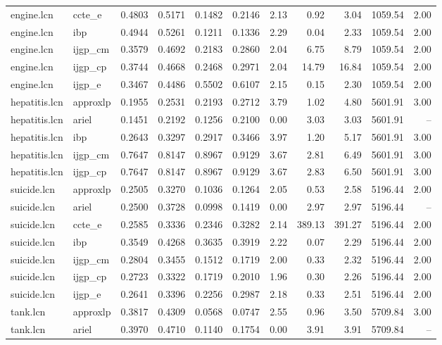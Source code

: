 \begin{table}[ht]
\begin{tabular}{llrrrrrrrrr}
engine.lcn & ccte_e & 0.4803 & 0.5171 & 0.1482 & 0.2146 & 2.13 & 0.92 & 3.04 & 1059.54 & 2.00 \\
engine.lcn & ibp & 0.4944 & 0.5261 & 0.1211 & 0.1336 & 2.29 & 0.04 & 2.33 & 1059.54 & 2.00 \\
engine.lcn & ijgp_cm & 0.3579 & 0.4692 & 0.2183 & 0.2860 & 2.04 & 6.75 & 8.79 & 1059.54 & 2.00 \\
engine.lcn & ijgp_cp & 0.3744 & 0.4668 & 0.2468 & 0.2971 & 2.04 & 14.79 & 16.84 & 1059.54 & 2.00 \\
engine.lcn & ijgp_e & 0.3467 & 0.4486 & 0.5502 & 0.6107 & 2.15 & 0.15 & 2.30 & 1059.54 & 2.00 \\
hepatitis.lcn & approxlp & 0.1955 & 0.2531 & 0.2193 & 0.2712 & 3.79 & 1.02 & 4.80 & 5601.91 & 3.00 \\
hepatitis.lcn & ariel & 0.1451 & 0.2192 & 0.1256 & 0.2100 & 0.00 & 3.03 & 3.03 & 5601.91 & -- \\
hepatitis.lcn & ibp & 0.2643 & 0.3297 & 0.2917 & 0.3466 & 3.97 & 1.20 & 5.17 & 5601.91 & 3.00 \\
hepatitis.lcn & ijgp_cm & 0.7647 & 0.8147 & 0.8967 & 0.9129 & 3.67 & 2.81 & 6.49 & 5601.91 & 3.00 \\
hepatitis.lcn & ijgp_cp & 0.7647 & 0.8147 & 0.8967 & 0.9129 & 3.67 & 2.83 & 6.50 & 5601.91 & 3.00 \\
suicide.lcn & approxlp & 0.2505 & 0.3270 & 0.1036 & 0.1264 & 2.05 & 0.53 & 2.58 & 5196.44 & 2.00 \\
suicide.lcn & ariel & 0.2500 & 0.3728 & 0.0998 & 0.1419 & 0.00 & 2.97 & 2.97 & 5196.44 & -- \\
suicide.lcn & ccte_e & 0.2585 & 0.3336 & 0.2346 & 0.3282 & 2.14 & 389.13 & 391.27 & 5196.44 & 2.00 \\
suicide.lcn & ibp & 0.3549 & 0.4268 & 0.3635 & 0.3919 & 2.22 & 0.07 & 2.29 & 5196.44 & 2.00 \\
suicide.lcn & ijgp_cm & 0.2804 & 0.3455 & 0.1512 & 0.1719 & 2.00 & 0.33 & 2.32 & 5196.44 & 2.00 \\
suicide.lcn & ijgp_cp & 0.2723 & 0.3322 & 0.1719 & 0.2010 & 1.96 & 0.30 & 2.26 & 5196.44 & 2.00 \\
suicide.lcn & ijgp_e & 0.2641 & 0.3396 & 0.2256 & 0.2987 & 2.18 & 0.33 & 2.51 & 5196.44 & 2.00 \\
tank.lcn & approxlp & 0.3817 & 0.4309 & 0.0568 & 0.0747 & 2.55 & 0.96 & 3.50 & 5709.84 & 3.00 \\
tank.lcn & ariel & 0.3970 & 0.4710 & 0.1140 & 0.1754 & 0.00 & 3.91 & 3.91 & 5709.84 & -- \\

\end{tabular}
\end{table}
